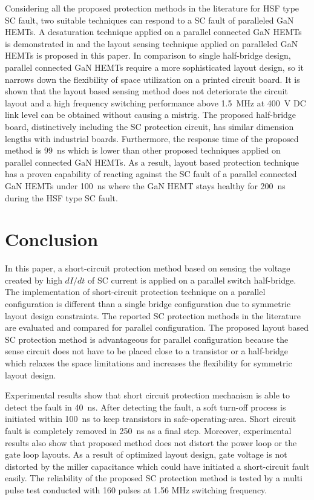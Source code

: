 \documentclass[journal]{IEEEtran}
\begin{document}
Considering all the proposed protection methods in the literature for HSF type SC fault, two suitable techniques can respond to a SC fault of paralleled GaN HEMTs. A desaturation technique applied on a parallel connected GaN HEMTs is demonstrated in \cite{Gui2018} and the layout sensing technique applied on paralleled GaN HEMTs is proposed in this paper. In comparison to single half-bridge design, parallel connected GaN HEMTs require a more sophisticated layout design, so it narrows down the flexibility of space utilization on a printed circuit board. It is shown that the layout based sensing method does not deteriorate the circuit layout and a high frequency switching performance above 1.5~MHz  at 400~V DC link level can be obtained without causing a mistrig. The proposed half-bridge board, distinctively including the SC protection circuit, has similar dimension lengths with industrial boards. Furthermore, the response time of the proposed method is 99~ns which is lower than other proposed techniques applied on parallel connected GaN HEMTs. As a result, layout based protection technique has a proven capability of reacting against the SC fault of a parallel connected GaN HEMTs under 100~ns where the GaN HEMT stays healthy for 200~ns \cite{Wu2020} during the HSF type SC fault.


\section{Conclusion}

In this paper, a short-circuit protection method based on sensing the voltage created by high $dI/dt$ of SC current is applied on a parallel switch half-bridge. The implementation of short-circuit protection technique on a parallel configuration is different than a single bridge configuration due to symmetric layout design constraints. The reported SC protection methods in the literature are evaluated and compared for parallel configuration. The proposed layout based SC protection method is advantageous for parallel configuration because the sense circuit does not have to be placed close to a transistor or a half-bridge which relaxes the space limitations and increases the flexibility for symmetric layout design.

Experimental results show that short circuit protection mechanism is able to detect the fault in 40~ns. After detecting the fault, a soft turn-off process is initiated within 100~ns to keep transistors in safe-operating-area. Short circuit fault is completely removed in 250~ns as a final step. Moreover, experimental results also show that proposed method does not distort the power loop or the gate loop layouts. As a result of optimized layout design, gate voltage is not distorted by the miller capacitance which could have initiated a short-circuit fault easily. The reliability of the proposed SC protection method is tested by a multi pulse test conducted with 160 pulses at 1.56 MHz switching frequency.
\end{document}
